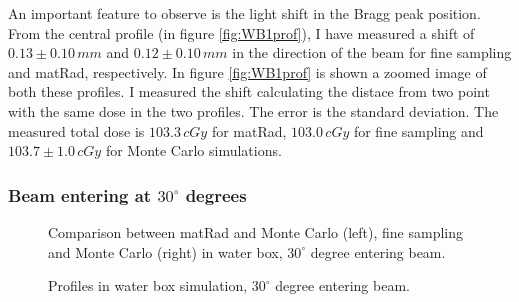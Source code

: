 \documentclass[12pt, a4paper, twoside]{book}
\begin{document}
An important feature to observe is the light shift in the Bragg peak position. From the central profile (in figure \ref{fig:WB1prof}), I have measured a shift of $0.13\pm0.10\,mm$ and $0.12\pm0.10\,mm$ in the direction of the beam for fine sampling and matRad, respectively. In figure \ref{fig:WB1prof} is shown a zoomed image of both these profiles. I measured the shift calculating the distace from two point with the same dose in the two profiles. The error is the standard deviation.
The measured total dose is $103.3\,cGy$ for matRad, $103.0\,cGy$ for fine sampling and $103.7\pm1.0\,cGy$ for Monte Carlo simulations.


\subsubsection{Beam entering at $30^\circ$ degrees}\label{30degrees}

\begin{figure}[!t]
\centering
{} 
\caption{Comparison between matRad and Monte Carlo (left), fine sampling and Monte Carlo (right) in water box,  $30^\circ$ degree entering beam.}
\label{fig:WB2gam}
\end{figure}

\begin{figure}[!b]
\centering
{}\quad
{}\quad
{}\quad
\caption{Profiles in water box simulation,  $30^\circ$ degree entering beam.}
\label{fig:WB2prof}
\end{figure}
\end{document}
